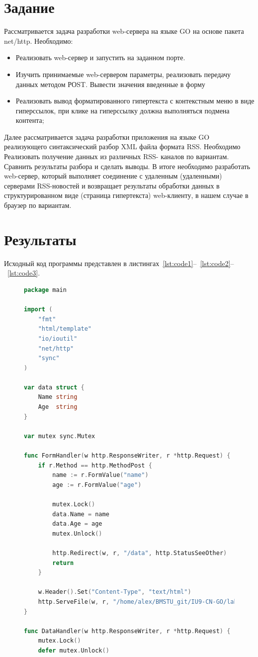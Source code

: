 \documentclass[a4paper, 14pt]{extarticle}
\begin{document}
\renewcommand{\ttdefault}{pcr}

\setlength{\tabcolsep}{3pt}
\newpage
\setcounter{page}{2}

\section{Задание}\label{Sect::task}
Рассматривается задача разработки web-сервера на языке GO на основе пакета net/http. 
Необходимо:
\begin{itemize}
\item Реализовать web-сервер и запустить на заданном порте.
\item Изучить принимаемые web-сервером параметры, реализовать передачу данных методом РОST. Вывести значения введенные в форму
\item Реализовать вывод форматированного гипертекста с контекстным меню в виде гиперссылок, при клике на гиперссылку должна выполняться подмена контента;
\end{itemize}
Далее рассматривается задача разработки приложения на языке GO реализующего синтаксический разбор XML файла формата RSS. 
Необходимо Реализовать получение данных из различных RSS- каналов по вариантам. Сравнить результаты разбора и сделать выводы.
В итоге необходимо разработать web-сервер, который выполняет соединение с удаленным (удаленными) серверами RSS-новостей и возвращает результаты обработки данных в структурированном виде (страница гипертекста) web-клиенту, в нашем случае в браузер по вариантам.
\section{Результаты}\label{Sect::res}

Исходный код программы представлен в листингах~\ref{lst:code1}--~\ref{lst:code2}--~\ref{lst:code3}.

\begin{figure}[!htb]
\begin{lstlisting}[language={Go},caption={o.1.go},label={lst:code1}]
package main

import (
	"fmt"
	"html/template"
	"io/ioutil"
	"net/http"
	"sync"
)

var data struct {
	Name string
	Age  string
}

var mutex sync.Mutex

func FormHandler(w http.ResponseWriter, r *http.Request) {
	if r.Method == http.MethodPost {
		name := r.FormValue("name")
		age := r.FormValue("age")

		mutex.Lock()
		data.Name = name
		data.Age = age
		mutex.Unlock()

		http.Redirect(w, r, "/data", http.StatusSeeOther)
		return
	}

	w.Header().Set("Content-Type", "text/html")
	http.ServeFile(w, r, "/home/alex/BMSTU_git/IU9-CN-GO/lab1/0.1/form.html")
}

func DataHandler(w http.ResponseWriter, r *http.Request) {
	mutex.Lock()
	defer mutex.Unlock()
\end{lstlisting}
\end{figure}
\end{document}
